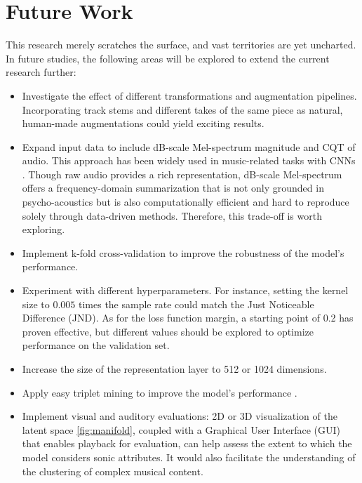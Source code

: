 \chapter{Future Work}

This research merely scratches the surface, and vast territories are yet uncharted. In future studies, the following areas will be explored to extend the current research further:

\begin{itemize}
  \item Investigate the effect of different transformations and augmentation pipelines. Incorporating track stems and different takes of the same piece as natural, human-made augmentations could yield exciting results.
  \item Expand input data to include dB-scale Mel-spectrum magnitude and CQT of audio. This approach has been widely used in music-related tasks with CNNs \cite{Kim2020OneStrategies}. Though raw audio provides a rich representation, dB-scale Mel-spectrum offers a frequency-domain summarization that is not only grounded in psycho-acoustics but is also computationally efficient and hard to reproduce solely through data-driven methods. Therefore, this trade-off is worth exploring.
  \item Implement k-fold cross-validation to improve the robustness of the model's performance.
  \item Experiment with different hyperparameters. For instance, setting the kernel size to $0.005$ times the sample rate could match the Just Noticeable Difference (JND). As for the loss function margin, a starting point of 0.2 has proven effective, but different values should be explored to optimize performance on the validation set.
  \item Increase the size of the representation layer to 512 or 1024 dimensions.
  \item Apply easy triplet mining to improve the model's performance \cite{XuanImprovedMining}.
  \item Implement visual and auditory evaluations: 2D or 3D visualization of the latent space \ref{fig:manifold}, coupled with a Graphical User Interface (GUI) that enables playback for evaluation, can help assess the extent to which the model considers sonic attributes. It would also facilitate the understanding of the clustering of complex musical content. 
\end{itemize}



\newpage